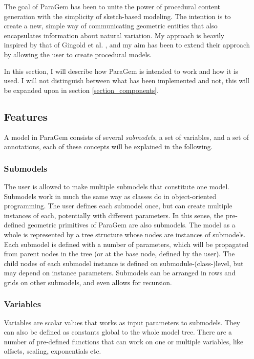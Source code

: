 \documentclass[english]{article}
\begin{document}
The goal of ParaGem has been to unite the power of procedural content generation with the simplicity of sketch-based modeling. The intention is to create a new, simple way of communicating geometric entities that also encapsulates information about natural variation. My approach is heavily inspired by that of Gingold et al. \cite{gingold09}, and my aim has been to extend their approach by allowing the user to create procedural models.

In this section, I will describe how ParaGem is intended to work and how it is used. I will not distinguish between what has been implemented and not, this will be expanded upon in section \ref{section_components}.

\subsection{Features}

A model in ParaGem consists of several \textit{submodels}, a set of variables, and a set of annotations, each of these concepts will be explained in the following.

\subsubsection{Submodels}

The user is allowed to make multiple submodels that constitute one model. Submodels work in much the same way as classes do in object-oriented programming. The user defines each submodel once, but can create multiple instances of each, potentially with different parameters. In this sense, the pre-defined geometric primitives of ParaGem are also submodels.
The model as a whole is represented by a tree structure whose nodes are instances of submodels. Each submodel is defined with a number of parameters, which will be propagated from parent nodes in the tree (or at the base node, defined by the user). The child nodes of each submodel instance is defined on submodule-(class-)level, but may depend on instance parameters. Submodels can be arranged in rows and grids on other submodels, and even allows for recursion.

\subsubsection{Variables}

Variables are scalar values that works as input parameters to submodels. They can also be defined as constants global to the whole model tree. There are a number of pre-defined functions that can work on one or multiple variables, like offsets, scaling, exponentials etc.
\end{document}

